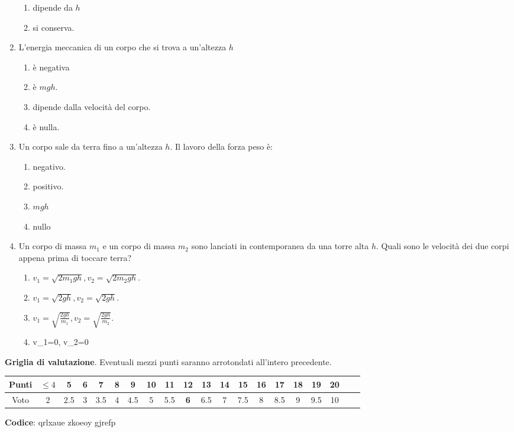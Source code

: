 \documentclass{article}
\begin{document}
\begin{enumerate}
\begin{enumerate}[label=\Alph*.]
    \item dipende da $h$
    \item si conserva.
  \end{enumerate}
  \item L'energia meccanica di un corpo che si trova a un'altezza $h$
  \begin{enumerate}[label=\Alph*.]
    \item è negativa
    \item è $mgh$.
    \item dipende dalla velocità del corpo.
    \item è nulla.
  \end{enumerate}
  \item Un corpo sale da terra fino a un'altezza $h$. Il lavoro della forza peso è:
  \begin{enumerate}[label=\Alph*.]
    \item negativo.
    \item positivo.
    \item $mgh$
    \item nullo
  \end{enumerate}
  \item Un corpo di massa $m_1$ e un corpo di massa $m_2$ sono lanciati in contemporanea da una torre alta $h$. Quali sono le velocità dei due corpi appena prima di toccare terra?
  \begin{enumerate}[label=\Alph*.]
    \item $v_1=\sqrt{2m_1gh}, v_2=\sqrt{2m_2gh}$.
    \item $v_1=\sqrt{2gh}, v_2=\sqrt{2gh}$.
    \item $v_1=\sqrt{\frac{2gh}{m_1}}, v_2=\sqrt{\frac{2gh}{m_2}}$.
    \item v_1=0, v_2=0
  \end{enumerate}
\end{enumerate}








\newpage \maketitle \centering \textbf{Griglia di valutazione}. Eventuali mezzi punti saranno arrotondati all'intero precedente. \begin{table}[h]     \centering \begin{tabular}{|c|c|c|c|c|c|c|c|c|c|c|c|c|c|c|c|c|c|c|c|} \hline Punti &  $\leq 4$ & 5 & 6 & 7 & 8 & 9 & 10 & 11 & \textbf{12} & 13 & 14 & 15 & 16 & 17 & 18 & 19 & 20 \\ \hline Voto & 2 & 2.5 & 3 & 3.5 & 4 & 4.5 & 5 & 5.5 & \textbf{6} & 6.5 & 7 & 7.5 & 8 & 8.5 & 9 & 9.5 & 10 \\ \hline \end{tabular} \end{table}
\textbf{Codice}: qrlxaue zkoeoy gjrefp
\end{document}
